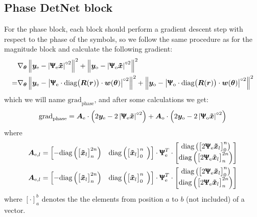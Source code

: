 \subsection{Phase DetNet block}

For the phase block, each block should perform a gradient descent step with respect to the phase of the symbols, so we follow the same procedure as for the magnitude block and calculate the following gradient:
 \begin{align}
	&\nabla_{\bm \theta}\left\lVert \bm y_\text{e} - \left|\bm{\Uppsi_\text{e}\tilde{x} } \right|^{\circ2}\right\rVert^2+\left\lVert \bm y_\text{o} - \left|\bm{\Uppsi_\text{o}\tilde{x} } \right|^{\circ2}\right\rVert^2\\
	=&\nabla_{\bm \theta}\left\lVert \bm y_\text{e} - \left|\bm{\Uppsi}_\text{e}\cdot\text{diag}\bigl(\bm R(\bm r)\bigr)\cdot\bm w(\bm \theta)  \right|^{\circ2}\right\rVert^2+\left\lVert \bm y_\text{o} - \left|\bm{\Uppsi}_\text{o}\cdot\text{diag}\bigl(\bm R(\bm r)\bigr)\cdot\bm w(\bm \theta)  \right|^{\circ2}\right\rVert^2
\end{align}
which we will name $\text{grad}_\text{phase}$, and after some calculations we get:
\begin{equation}
\text{grad}_\text{phase}=\bm A_\text{e}\cdot\left(2\bm y_\text{e} - 2\left|\bm{\Uppsi}_\text{e}\bm{\tilde{x}}\right|^{\circ2}\right)+
\bm A_\text{o}\cdot\left(2\bm y_\text{o} - 2\left|\bm{\Uppsi}_\text{o}\bm{\tilde{x}}\right|^{\circ2}\right)
\label{eq:grad_phase}
\end{equation}
where
\begin{align}
\bm A_{\text{e},l}&=\begin{bmatrix}-\text{diag}\left(\bigl[\bm{\tilde{x}}_l\bigr]_{n}^{2n}\right)&\text{diag}\left(\bigl[\bm{\tilde{x}}_l\bigr]_0^{n\phantom{1}}\right)\end{bmatrix}\cdot\bm{\Uppsi}_\text{e}^T\cdot\begin{bmatrix}\text{diag}\left(\bigl[2\bm{\Uppsi}_\text{e}\bm{\tilde{x}}_l\bigr]_0^n\right)\\\text{diag}\left(\bigl[2\bm{\Uppsi}_\text{e}\bm{\tilde{x}}_l\bigr]_{n}^{2n}\right)\end{bmatrix}\\
\bm A_{\text{e},l}&=\begin{bmatrix}-\text{diag}\left(\bigl[\bm{\tilde{x}}_l\bigr]_{n}^{2n}\right)&\text{diag}\left(\bigl[\bm{\tilde{x}}_l\bigr]_0^{n\phantom{1}}\right)\end{bmatrix}\cdot\bm{\Uppsi}_\text{e}^T\cdot\begin{bmatrix}\text{diag}\left(\bigl[2\bm{\Uppsi}_\text{e}\bm{\tilde{x}}_l\bigr]_0^n\right)\\\text{diag}\left(\bigl[2\bm{\Uppsi}_\text{e}\bm{\tilde{x}}_l\bigr]_{n}^{2n}\right)\end{bmatrix}
\end{align}
where $[\cdot]_a^b$ denotes the the elements from position $a$ to $b$ (not included) of a vector.


